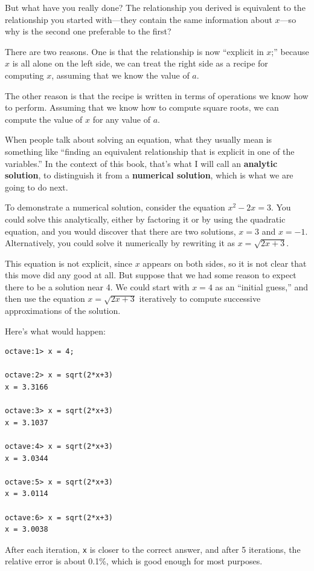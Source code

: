 \documentclass{book}
\begin{document}
But what have you really done? The relationship you derived is
equivalent to the relationship you started with---they contain the
same information about $x$---so why is the second one preferable
to the first?

There are two reasons. One is that the relationship is now ``explicit
in $x$;'' because $x$ is all alone on the left side, we can treat
the right side as a recipe for computing $x$, assuming that we
know the value of $a$.

The other reason is that the recipe is written in terms of operations
we know how to perform. Assuming that we know how to compute square
roots, we can compute the value of $x$ for any value of $a$.

When people talk about solving an equation, what they usually mean
is something like ``finding an equivalent relationship that is
explicit in one of the variables.'' In the context of this book,
that's what I will call an {\bf analytic solution}, to distinguish
it from a {\bf numerical solution}, which is what we are going to
do next.

To demonstrate a numerical solution, consider the equation $x^2 - 2x =
3$. You could solve this analytically, either by factoring it or by
using the quadratic equation, and you would discover that there are
two solutions, $x=3$ and $x=-1$. Alternatively, you could solve it
numerically by rewriting it as $x = \sqrt{2x+3}$.

This equation is not explicit, since $x$ appears on both sides, so
it is not clear that this move did any good at all. But suppose
that we had some reason to expect there to be a solution near 4.
We could start with $x=4$ as an ``initial guess,'' and then use
the equation $x = \sqrt{2x+3}$ iteratively to compute successive
approximations of the solution.

Here's what would happen:

\begin{verbatim}
octave:1> x = 4;

octave:2> x = sqrt(2*x+3)
x = 3.3166

octave:3> x = sqrt(2*x+3)
x = 3.1037

octave:4> x = sqrt(2*x+3)
x = 3.0344

octave:5> x = sqrt(2*x+3)
x = 3.0114

octave:6> x = sqrt(2*x+3)
x = 3.0038
\end{verbatim}

After each iteration, {\tt x} is closer to the correct answer,
and after 5 iterations, the relative error is about 0.1\%, which
is good enough for most purposes.
\end{document}
